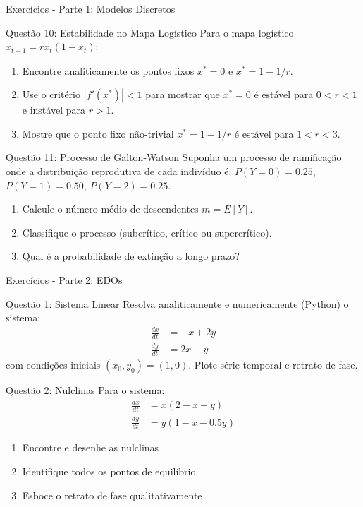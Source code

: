 \begin{frame}[allowframebreaks]{Exercícios - Parte 1: Modelos Discretos}
\begin{block}{Questão 10: Estabilidade no Mapa Logístico}
Para o mapa logístico $x_{t+1} = r x_t (1 - x_t)$:
\begin{enumerate}
    \item Encontre analiticamente os pontos fixos $x^* = 0$ e $x^* = 1 - 1/r$.
    \item Use o critério $|f'(x^*)| < 1$ para mostrar que $x^* = 0$ é estável para $0 < r < 1$ e instável para $r > 1$.
    \item Mostre que o ponto fixo não-trivial $x^* = 1 - 1/r$ é estável para $1 < r < 3$.
\end{enumerate}
\end{block}

\begin{block}{Questão 11: Processo de Galton-Watson}
Suponha um processo de ramificação onde a distribuição reprodutiva de cada indivíduo é:
$P(Y=0) = 0.25$, $P(Y=1) = 0.50$, $P(Y=2) = 0.25$.
\begin{enumerate}
    \item Calcule o número médio de descendentes $m = E[Y]$.
    \item Classifique o processo (subcrítico, crítico ou supercrítico).
    \item Qual é a probabilidade de extinção a longo prazo?
\end{enumerate}
\end{block}
\end{frame}

\begin{frame}[allowframebreaks]{Exercícios - Parte 2: EDOs}
\begin{block}{Questão 1: Sistema Linear}
Resolva analiticamente e numericamente (Python) o sistema:
\begin{align*}
\frac{dx}{dt} &= -x + 2y\\
\frac{dy}{dt} &= 2x - y
\end{align*}
com condições iniciais $(x_0, y_0) = (1, 0)$. Plote série temporal e retrato de fase.
\end{block}

\begin{block}{Questão 2: Nulclinas}
Para o sistema:
\begin{align*}
\frac{dx}{dt} &= x(2 - x - y)\\
\frac{dy}{dt} &= y(1 - x - 0.5y)
\end{align*}
\begin{enumerate}
    \item Encontre e desenhe as nulclinas
    \item Identifique todos os pontos de equilíbrio
    \item Esboce o retrato de fase qualitativamente
\end{enumerate}
\end{block}
\end{frame}


